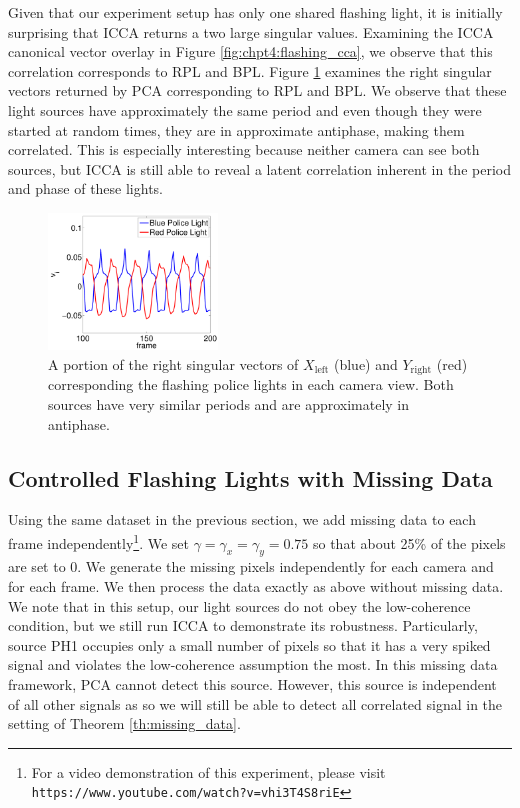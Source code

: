 Given that our experiment setup has only one shared flashing light, it is initially
surprising that ICCA returns a two large singular values. Examining the ICCA canonical
vector overlay in Figure \ref{fig:chpt4:flashing_cca}, we observe that this correlation
corresponds to RPL and BPL. Figure \ref{fig:chpt4:flashing_v} examines the right singular
vectors returned by PCA corresponding to RPL and BPL. We observe that these light sources
have approximately the same period and even though they were started at random times, they
are in approximate antiphase, making them correlated. This is especially interesting
because neither camera can see both sources, but ICCA is still able to reveal a latent
correlation inherent in the period and phase of these lights.

\begin{figure}
  \begin{center}
      \includegraphics[width=0.4\textwidth]{figs/fig8.pdf}
    \caption{A portion of the right singular vectors of $X_{\text{left}}$ (blue) and
      $Y_{\text{right}}$ (red) corresponding the flashing police lights in each camera
      view. Both sources have very similar periods and are approximately in antiphase. }
    \label{fig:chpt4:flashing_v}
  \end{center}
\end{figure}

\subsection{Controlled Flashing Lights with Missing Data}

Using the same dataset in the previous section, we add missing data to each frame
independently\footnote{For a video demonstration of this experiment, please visit \texttt{https://www.youtube.com/watch?v=vhi3T4S8riE}}. We set $\gamma=\gamma_x=\gamma_y=0.75$ so that about 25\% of the pixels are
set to 0. We generate the missing pixels independently for each camera and for each
frame. We then process the data exactly as above without missing data. We note that in
this setup, our light sources do not obey the low-coherence condition, but we still run
ICCA to demonstrate its robustness. Particularly, source PH1 occupies only a small number
of pixels so that it has a very spiked signal and violates the low-coherence assumption
the most. In this missing data framework, PCA cannot detect this source. However, this
source is independent of all other signals as so we will still be able to detect all
correlated signal in the setting of Theorem \ref{th:missing_data}.

